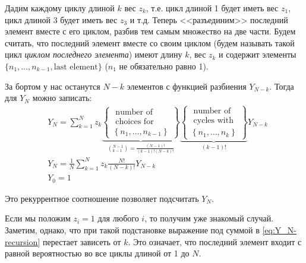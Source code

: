 Дадим каждому циклу длиной $k$ вес $z_k$, т.е. цикл длиной 1 будет иметь вес $z_1$, цикл длиной 3 будет иметь вес $z_3$ и т.д.
Теперь <<разъединим>> последний элемент вместе с его циклом, разбив тем самым множество на две части.
Будем считать, что последний элемент вместе со своим циклом (будем называть такой цикл \textit{циклом последнего элемента}) имеют длину $k$, вес $z_k$ и содержит элементы $\{n_1, \dots, n_{k-1}, \text{last element}\}$ ($n_1$ не обязательно равно 1).

За бортом у нас останутся $N-k$ элементов с функцией разбиения $Y_{N-k}$.
Тогда для $Y_N$ можно записать:
\begin{align}
    \nonumber
    & Y_{N}=\sum_{k=1}^{N} z_{k}
    \underbrace{\left\{\begin{array}{c}\text { number of } \\ \text { choices for } \\ \left\{n_{1}, \ldots, n_{k-1}\right\}\end{array}\right\}}_{\left({}^{N-1}_{k-1}\right)=\frac{(N-1)!}{(k-1)!(N-k)!}}
    \underbrace{\left\{\begin{array}{c}\text { number of } \\ \text { cycles with } \\ \left\{n_{1}, \ldots, n_{k}\right\}\end{array}\right\}}_{(k-1)!}
    Y_{N-k} \\
    \label{eq:Y_N-recursion}
    & Y_N = \frac{1}{N} \sum_{k=1}^{N} z_{k} \frac{N !}{(N-k) !} Y_{N-k} \\
    & Y_0 = 1
\end{align}

Это рекуррентное соотношение позволяет подсчитать $Y_N$.

Если мы положим $z_i = 1$ для любого $i$, то получим уже знакомый случай.
Заметим, однако, что при такой подстановке выражение под суммой в \eqref{eq:Y_N-recursion} перестает зависеть от $k$.
Это означает, что последний элемент входит с равной вероятностью во все циклы длиной от 1 до $N$.

